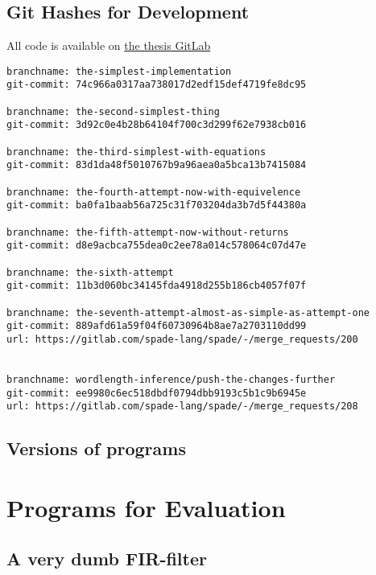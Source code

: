 \documentclass[msc,lith,english]{liuthesis}
\begin{document}
\section{Git Hashes for Development}
All code is available on \href{https://gitlab.com/FredTheDino/spade}{the thesis GitLab}
\begin{verbatim}
branchname: the-simplest-implementation
git-commit: 74c966a0317aa738017d2edf15def4719fe8dc95

branchname: the-second-simplest-thing
git-commit: 3d92c0e4b28b64104f700c3d299f62e7938cb016

branchname: the-third-simplest-with-equations
git-commit: 83d1da48f5010767b9a96aea0a5bca13b7415084

branchname: the-fourth-attempt-now-with-equivelence
git-commit: ba0fa1baab56a725c31f703204da3b7d5f44380a

branchname: the-fifth-attempt-now-without-returns
git-commit: d8e9acbca755dea0c2ee78a014c578064c07d47e

branchname: the-sixth-attempt
git-commit: 11b3d060bc34145fda4918d255b186cb4057f07f

branchname: the-seventh-attempt-almost-as-simple-as-attempt-one
git-commit: 889afd61a59f04f60730964b8ae7a2703110dd99
url: https://gitlab.com/spade-lang/spade/-/merge_requests/200


branchname: wordlength-inference/push-the-changes-further
git-commit: ee9980c6ec518dbdf0794dbb9193c5b1c9b6945e
url: https://gitlab.com/spade-lang/spade/-/merge_requests/208
\end{verbatim}

\section{Versions of programs}

\chapter{Programs for Evaluation}
\label{app:Programs}

\section{A very dumb FIR-filter}
\end{document}
